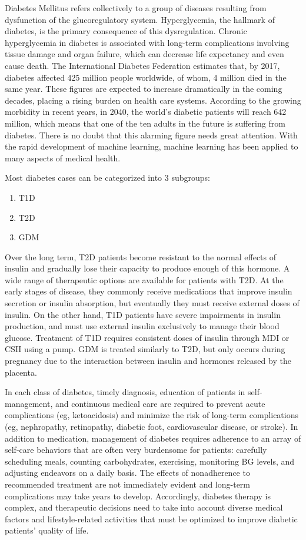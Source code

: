 \documentclass[12pt]{article}
\begin{document}
Diabetes Mellitus refers collectively to a group of diseases resulting from dysfunction of the glucoregulatory system. Hyperglycemia, the hallmark of diabetes, is the primary consequence of this dysregulation. Chronic hyperglycemia in diabetes is associated with long-term complications involving tissue damage and organ failure, which can decrease life expectancy and even cause death. The International Diabetes Federation estimates that, by 2017, diabetes affected 425 million people worldwide, of whom, 4 million died in the same year. These figures are expected to increase dramatically in the coming decades, placing a rising burden on health care systems. According to the growing morbidity in recent years, in 2040, the world’s diabetic patients will reach 642 million, which means that one of the ten adults in the future is suffering from diabetes. There is no doubt that this alarming figure needs great attention. With the rapid development of machine learning, machine learning has been applied to many aspects of medical health.\cite{DBTW}

Most diabetes cases can be categorized into 3 subgroups: 
\begin{enumerate}
\item T1D
\item T2D
\item GDM
\end{enumerate}

Over the long term, T2D patients become resistant to the normal effects of insulin and gradually lose their capacity to produce enough of this hormone. A wide range of therapeutic options are available for patients with T2D. At the early stages of disease, they commonly receive medications that improve insulin secretion or insulin absorption, but eventually they must receive external doses of insulin. On the other hand, T1D patients have severe impairments in insulin production, and must use external insulin exclusively to manage their blood glucose. Treatment of T1D requires consistent doses of insulin through MDI or CSII using a pump. GDM is treated similarly to T2D, but only occurs during pregnancy due to the interaction between insulin and hormones released by the placenta.

In each class of diabetes, timely diagnosis, education of patients in self-management, and continuous medical care are required to prevent acute complications (eg, ketoacidosis) and minimize the risk of long-term complications (eg, nephropathy, retinopathy, diabetic foot, cardiovascular disease, or stroke). In addition to medication, management of diabetes requires adherence to an array of self-care behaviors that are often very burdensome for patients: carefully scheduling meals, counting carbohydrates, exercising, monitoring BG levels, and adjusting endeavors on a daily basis. The effects of nonadherence to recommended treatment are not immediately evident and long-term complications may take years to develop. Accordingly, diabetes therapy is complex, and therapeutic decisions need to take into account diverse medical factors and lifestyle-related activities that must be optimized to improve diabetic patients’ quality of life.
\end{document}

